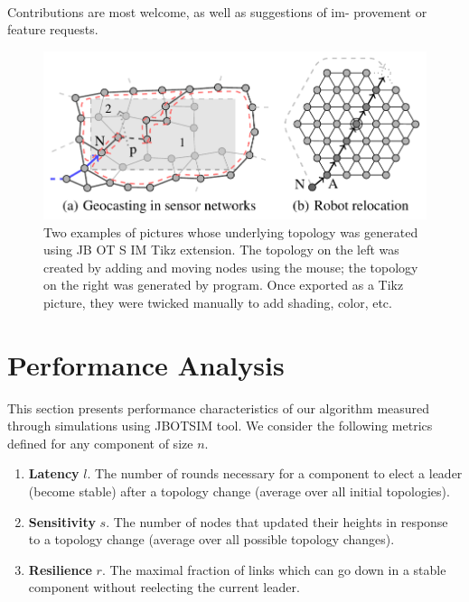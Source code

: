 \paragraph{}Contributions are most welcome, as well as suggestions of im- provement or feature requests.

\begin{figure}[h]
	\centering
	\includegraphics[width=0.7\linewidth]{fig_7}
	\caption[Two examples of pictures whose underlying topology was generated using JB OT S IM Tikz extension. The topology on the left was created by adding and moving nodes using the mouse; the topology on the right was generated by program. Once exported as a Tikz picture, they were twicked manually to add shading, color, etc.]{Two examples of pictures whose underlying topology was generated using JB OT S IM Tikz extension. The topology on the left was created by adding and moving nodes using the mouse; the topology on the right was generated by program. Once exported as a Tikz picture, they were twicked manually to add shading, color, etc.}
	\label{fig:fig7}
\end{figure}


\section{Performance Analysis}

This section presents performance characteristics of our algorithm measured through simulations using JBOTSIM\cite{26} tool. We consider the following metrics defined for any component of size $n$.

\begin{enumerate}
	\item \textbf{Latency} $l$. The number of rounds necessary for a component to elect a leader (become stable) after a topology change (average over all initial topologies).
	
	\item \textbf{Sensitivity} $s$. The number of nodes that updated their heights in response to a topology change (average over all possible topology changes).
	
	\item \textbf{Resilience} $r$. The maximal fraction of links which can go down in a stable component without reelecting the current leader.
	
\end{enumerate}


